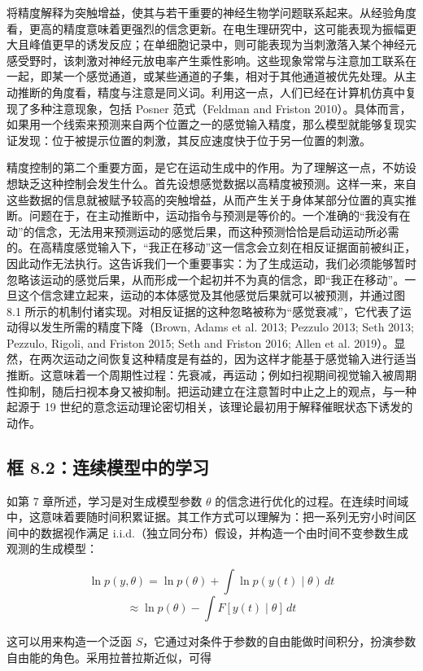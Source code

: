将精度解释为突触增益，使其与若干重要的神经生物学问题联系起来。从经验角度看，更高的精度意味着更强烈的信念更新。在电生理研究中，这可能表现为振幅更大且峰值更早的诱发反应；在单细胞记录中，则可能表现为当刺激落入某个神经元感受野时，该刺激对神经元放电率产生乘性影响。这些现象常常与注意加工联系在一起，即某一个感觉通道，或某些通道的子集，相对于其他通道被优先处理。从主动推断的角度看，精度与注意是同义词。利用这一点，人们已经在计算机仿真中复现了多种注意现象，包括 Posner 范式（Feldman and Friston 2010）。具体而言，如果用一个线索来预测来自两个位置之一的感觉输入精度，那么模型就能够复现实证发现：位于被提示位置的刺激，其反应速度快于位于另一位置的刺激。

精度控制的第二个重要方面，是它在运动生成中的作用。为了理解这一点，不妨设想缺乏这种控制会发生什么。首先设想感觉数据以高精度被预测。这样一来，来自这些数据的信息就被赋予较高的突触增益，从而产生关于身体某部分位置的真实推断。问题在于，在主动推断中，运动指令与预测是等价的。一个准确的“我没有在动”的信念，无法用来预测运动的感觉后果，而这种预测恰恰是启动运动所必需的。在高精度感觉输入下，“我正在移动”这一信念会立刻在相反证据面前被纠正，因此动作无法执行。这告诉我们一个重要事实：为了生成运动，我们必须能够暂时忽略该运动的感觉后果，从而形成一个起初并不为真的信念，即“我正在移动”。一旦这个信念建立起来，运动的本体感觉及其他感觉后果就可以被预测，并通过图 8.1 所示的机制付诸实现。对相反证据的这种忽略被称为“感觉衰减”，它代表了运动得以发生所需的精度下降（Brown, Adams et al. 2013; Pezzulo 2013; Seth 2013; Pezzulo, Rigoli, and Friston 2015; Seth and Friston 2016; Allen et al. 2019）。显然，在两次运动之间恢复这种精度是有益的，因为这样才能基于感觉输入进行适当推断。这意味着一个周期性过程：先衰减，再运动；例如扫视期间视觉输入被周期性抑制，随后扫视本身又被抑制。把运动建立在注意暂时中止之上的观点，与一种起源于 19 世纪的意念运动理论密切相关，该理论最初用于解释催眠状态下诱发的动作。

\subsection{框 8.2：连续模型中的学习}

如第 7 章所述，学习是对生成模型参数 $\theta$ 的信念进行优化的过程。在连续时间域中，这意味着要随时间积累证据。其工作方式可以理解为：把一系列无穷小时间区间中的数据视作满足 i.i.d.（独立同分布）假设，并构造一个由时间不变参数生成观测的生成模型：

\[
\ln p(y,\theta) = \ln p(\theta) + \int \ln p(y(t)\mid \theta)\, dt
\]
\[
\approx \ln p(\theta) - \int F[y(t)\mid \theta]\, dt
\]

这可以用来构造一个泛函 $S$，它通过对条件于参数的自由能做时间积分，扮演参数自由能的角色。采用拉普拉斯近似，可得

